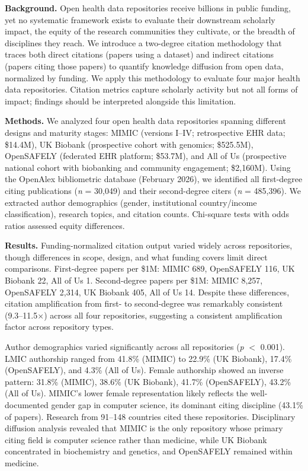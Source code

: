 \documentclass[11pt]{article}
\begin{document}
\vspace{0.2em}

{\small
\textbf{Background.}
Open health data repositories receive billions in public funding, yet no systematic framework exists to evaluate their downstream scholarly impact, the equity of the research communities they cultivate, or the breadth of disciplines they reach. We introduce a two-degree citation methodology that traces both direct citations (papers using a dataset) and indirect citations (papers citing those papers) to quantify knowledge diffusion from open data, normalized by funding. We apply this methodology to evaluate four major health data repositories. Citation metrics capture scholarly activity but not all forms of impact; findings should be interpreted alongside this limitation.

\textbf{Methods.}
We analyzed four open health data repositories spanning different designs and maturity stages: MIMIC (versions I--IV; retrospective EHR data; \$14.4M), UK Biobank (prospective cohort with genomics; \$525.5M), OpenSAFELY (federated EHR platform; \$53.7M), and All of Us (prospective national cohort with biobanking and community engagement; \$2,160M). Using the OpenAlex bibliometric database (February 2026), we identified all first-degree citing publications (\textit{n} = 30,049) and their second-degree citers (\textit{n} = 485,396). We extracted author demographics (gender, institutional country/income classification), research topics, and citation counts. Chi-square tests with odds ratios assessed equity differences.

\textbf{Results.}
Funding-normalized citation output varied widely across repositories, though differences in scope, design, and what funding covers limit direct comparisons. First-degree papers per \$1M: MIMIC 689, OpenSAFELY 116, UK Biobank 22, All of Us 1. Second-degree papers per \$1M: MIMIC 8,257, OpenSAFELY 2,314, UK Biobank 405, All of Us 14. Despite these differences, citation amplification from first- to second-degree was remarkably consistent (9.3--11.5$\times$) across all four repositories, suggesting a consistent amplification factor across repository types.

Author demographics varied significantly across all repositories (\textit{p} $<$ 0.001). LMIC authorship ranged from 41.8\% (MIMIC) to 22.9\% (UK Biobank), 17.4\% (OpenSAFELY), and 4.3\% (All of Us). Female authorship showed an inverse pattern: 31.8\% (MIMIC), 38.6\% (UK Biobank), 41.7\% (OpenSAFELY), 43.2\% (All of Us). MIMIC's lower female representation likely reflects the well-documented gender gap in computer science, its dominant citing discipline (43.1\% of papers). Research from 91--148 countries cited these repositories. Disciplinary diffusion analysis revealed that MIMIC is the only repository whose primary citing field is computer science rather than medicine, while UK Biobank concentrated in biochemistry and genetics, and OpenSAFELY remained within medicine.

}
\end{document}
